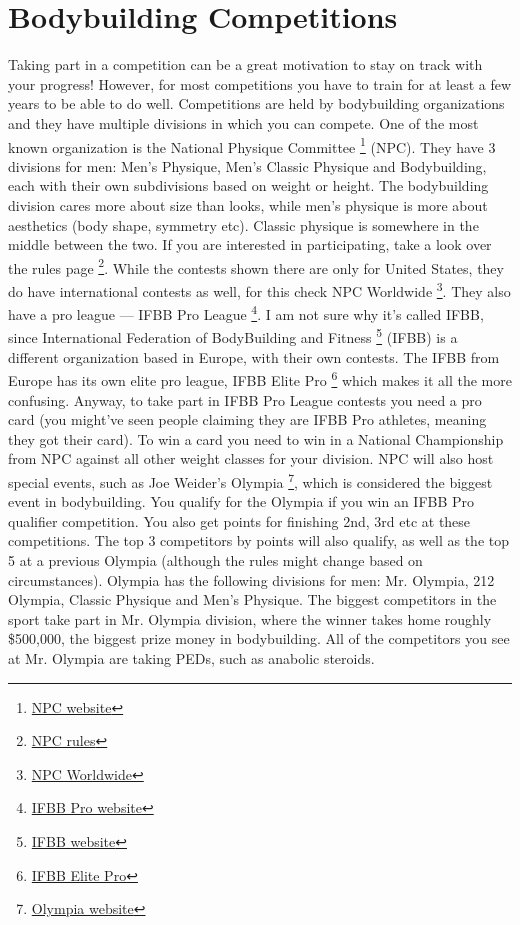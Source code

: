 \documentclass[openany, 12pt]{book}
\begin{document}
        \section{Bodybuilding Competitions}

        Taking part in a competition can be a great motivation to stay on track with your progress! However, for most competitions you have to train for at least a few years to be able to do well.
        Competitions are held by bodybuilding organizations and they have multiple divisions in which you can compete. One of the most known organization is the National Physique Committee
        \footnote{\href{https://npcnewsonline.com/}{NPC website}} (NPC). They have 3 divisions for men: Men's Physique, Men's Classic Physique and Bodybuilding, each with their own subdivisions
        based on weight or height. The bodybuilding division cares more about size than looks, while men's physique is more about aesthetics (body shape, symmetry etc). Classic physique is somewhere
        in the middle between the two. If you are interested in participating, take a look over the rules page
        \footnote{\href{https://npcnewsonline.com/official-bodybuilding-rules/}{NPC rules}}. While the contests shown there are only for United States, they do have international contests
        as well, for this check NPC Worldwide
        \footnote{\href{https://www.ifbbpro.com/category/all-categories/pro-qualifier/}{NPC Worldwide}}. They also have a pro league --- IFBB Pro League
        \footnote{\href{https://www.ifbbpro.com/}{IFBB Pro website}}. I am not sure why it's called IFBB, since International Federation of BodyBuilding and Fitness
        \footnote{\href{https://ifbb.com/}{IFBB website}} (IFBB) is a different organization based in Europe, with their own contests. The IFBB from Europe has its own elite pro league,
        IFBB Elite Pro
        \footnote{\href{https://eliteprocard.com/}{IFBB Elite Pro}} which makes it all the more confusing. Anyway, to take part in IFBB Pro League contests you need a pro card (you might've seen
        people claiming they are IFBB Pro athletes, meaning they got their card). To win a card you need to win in a National Championship from NPC against all other weight classes for your division.
        NPC will also host special events, such as Joe Weider's Olympia
        \footnote{\href{https://mrolympia.com/}{Olympia website}}, which is considered the biggest event in bodybuilding. You qualify for the Olympia if you win an IFBB Pro qualifier competition.
        You also get points for finishing 2nd, 3rd etc at these competitions. The top 3 competitors by points will also qualify, as well as the top 5 at a previous Olympia (although the rules
        might change based on circumstances). Olympia has the following divisions for men: Mr. Olympia, 212 Olympia, Classic Physique and Men's Physique. The biggest competitors in the sport take
        part in Mr. Olympia division, where the winner takes home roughly \$500,000, the biggest prize money in bodybuilding. All of the competitors you see at Mr. Olympia are taking PEDs, such
        as anabolic steroids.
\end{document}
